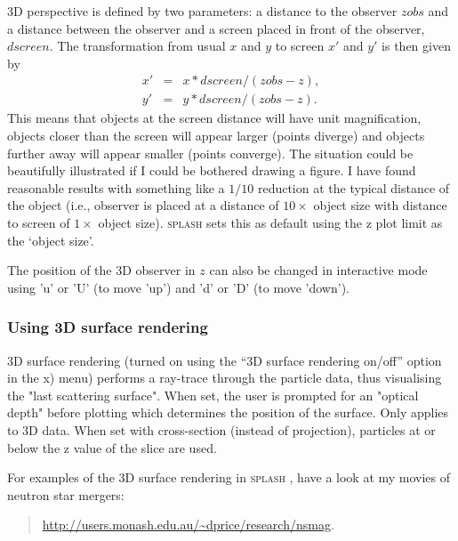\documentclass[a4paper,10pt]{article}
\newcommand{\splash}{\textsc{splash }}
\begin{document}
  3D perspective is defined by two parameters: a distance to the observer $zobs$ and a distance between the observer and a screen placed in front of the observer, $dscreen$.
The transformation from usual $x$ and $y$ to screen $x'$ and $y'$ is then given by
\begin{eqnarray}
x' & = & x*dscreen/(zobs-z), \nonumber \\
y' & = & y*dscreen/(zobs-z).
\end{eqnarray}
 This means that objects at the screen distance will have unit magnification, objects closer than the
screen will appear larger (points diverge) and objects further away will appear smaller (points
converge). The situation could be beautifully illustrated if I could be bothered drawing a figure. I have found reasonable results with something like a $1/10$ reduction at the typical distance of the object (i.e., observer is placed at a distance of $10\times$ object size with distance to screen of $1\times$ object size). \splash sets this as default using the z plot limit as the `object size'.

 The position of the 3D observer in $z$ can also be changed in interactive mode using 'u' or 'U' (to move 'up') and 'd' or 'D' (to move 'down'). 

\subsubsection{ Using 3D surface rendering}
 3D surface rendering (turned on using the ``3D surface rendering on/off'' option in the x) menu) performs a ray-trace through the particle data, thus visualising the "last scattering surface". When set, the user is prompted for an "optical depth" before plotting which determines the position of the surface. Only applies to 3D data. When set with cross-section (instead of projection), particles at or below the z value of the slice are used.

For examples of the 3D surface rendering in \splash, have a look at my movies of neutron star mergers:
\begin{quote}
  \url{http://users.monash.edu.au/~dprice/research/nsmag}.
\end{quote}
\end{document}
